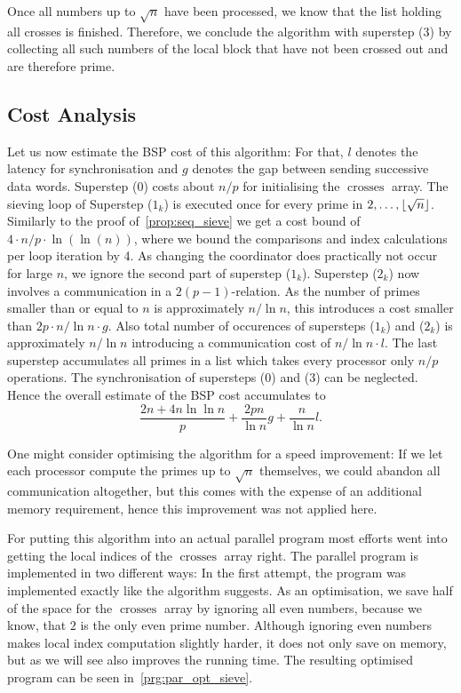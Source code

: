 \documentclass[a4paper,12pt]{article}
\DeclarePairedDelimiter\floor{\lfloor}{\rfloor}
\DeclareMathOperator{\crosses}{crosses}
\begin{document}
Once all numbers up to $\sqrt{n}$ have been processed, we know that the list holding all crosses is finished.
Therefore, we conclude the algorithm with superstep ($3$) by collecting all such numbers of the local block that have not been crossed out and are therefore prime.

\subsection{Cost Analysis}

Let us now estimate the BSP cost of this algorithm:
For that, $l$ denotes the latency for synchronisation and $g$ denotes the gap between sending successive data words.
Superstep ($0$) costs about $n/p$ for initialising the $\crosses$ array.
The sieving loop of Superstep ($1_k$) is executed once for every prime in $2,\dots,\floor{\sqrt{n}}$.
Similarly to the proof of~\autoref{prop:seq_sieve} we get a cost bound of $4\cdot n/p \cdot \ln(\ln(n))$, where we bound the comparisons and index calculations per loop iteration by 4.
As changing the coordinator does practically not occur for large $n$, we ignore the second part of superstep ($1_k$).
Superstep ($2_k$) now involves a communication in a $2(p-1)$-relation.
As the number of primes smaller than or equal to $n$ is approximately $n/\ln n$, this introduces a cost smaller than $2p\cdot n/\ln n\cdot g$.
Also total number of occurences of supersteps ($1_k$) and ($2_k$) is approximately  $n/\ln n$ introducing a communication cost of $n/\ln n \cdot l$.
The last superstep accumulates all primes in a list which takes every processor only $n/p$ operations.
The synchronisation of supersteps ($0$) and ($3$) can be neglected.
Hence the overall estimate of the BSP cost accumulates to
\[
	\frac{2n + 4n \ln \ln n}{p} + \frac{2p n}{\ln n}g + \frac{n}{\ln n} l.
\]

One might consider optimising the algorithm for a speed improvement:
If we let each processor compute the primes up to $\sqrt{n}$ themselves, we could abandon all communication altogether, but this comes with the expense of an additional memory requirement, hence this improvement was not applied here.

For putting this algorithm into an actual parallel program most efforts went into getting the local indices of the $\crosses$ array right.
The parallel program is implemented in two different ways:
In the first attempt, the program was implemented exactly like the algorithm suggests.
As an optimisation, we save half of the space for the $\crosses$ array by ignoring all even numbers, because we know, that $2$ is the only even prime number.
Although ignoring even numbers makes local index computation slightly harder, it does not only save on memory, but as we will see also improves the running time.
The resulting optimised program can be seen in~\autoref{prg:par_opt_sieve}.
\end{document}
